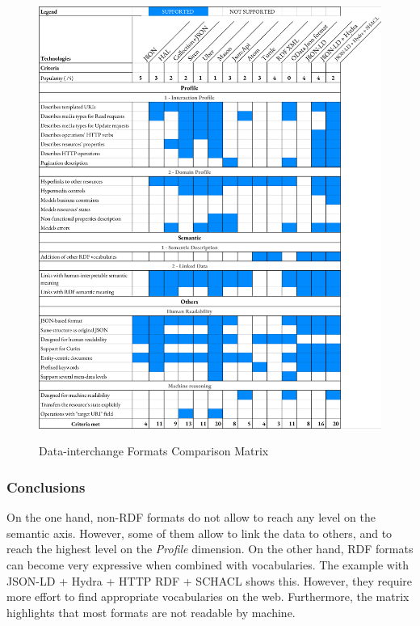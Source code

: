 \begin{figure}[t]
\caption{Data-interchange Formats Comparison Matrix}
\includegraphics[width=1\textwidth]{figures/DIF.png}
\label{interchange-formats-matrix}
\end{figure}

\subsubsection*{Conclusions}

On the one hand, non-RDF formats do not allow to reach any level on the semantic axis. However, some of them allow to link the data to others, and to reach the highest level on the \textit{Profile} dimension.
On the other hand, RDF formats can become very expressive when combined with vocabularies. The example with JSON-LD + Hydra + HTTP RDF + SCHACL shows this. However, they require more effort to find appropriate vocabularies on the web.
Furthermore, the matrix highlights that most formats are not readable by machine.

